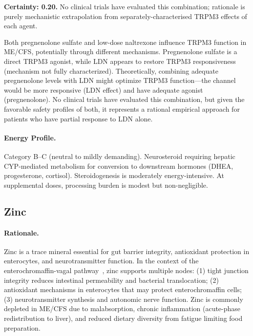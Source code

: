 \begin{speculation}
\label{spec:pregnenolone-ldn-synergy}
\textbf{Certainty: 0.20.} No clinical trials have evaluated this combination; rationale is purely mechanistic extrapolation from separately-characterised TRPM3 effects of each agent.

Both pregnenolone sulfate and low-dose naltrexone influence TRPM3 function in ME/CFS, potentially through different mechanisms. Pregnenolone sulfate is a direct TRPM3 agonist, while LDN appears to restore TRPM3 responsiveness (mechanism not fully characterized). Theoretically, combining adequate pregnenolone levels with LDN might optimize TRPM3 function---the channel would be more responsive (LDN effect) and have adequate agonist (pregnenolone). No clinical trials have evaluated this combination, but given the favorable safety profiles of both, it represents a rational empirical approach for patients who have partial response to LDN alone.
\end{speculation}

\paragraph{Energy Profile.}
Category B--C (neutral to mildly demanding). Neurosteroid requiring hepatic CYP-mediated metabolism for conversion to downstream hormones (DHEA, progesterone, cortisol). Steroidogenesis is moderately energy-intensive. At supplemental doses, processing burden is modest but non-negligible.

\subsection{Zinc}
\label{subsec:zinc}

\paragraph{Rationale.} Zinc is a trace mineral essential for gut barrier integrity, antioxidant protection in enterocytes, and neurotransmitter function. In the context of the enterochromaffin-vagal pathway~\cite{WirthScheibenbogen2025Neurotransmitter}, zinc supports multiple nodes: (1) tight junction integrity reduces intestinal permeability and bacterial translocation; (2) antioxidant mechanisms in enterocytes that may protect enterochromaffin cells; (3) neurotransmitter synthesis and autonomic nerve function. Zinc is commonly depleted in ME/CFS due to malabsorption, chronic inflammation (acute-phase redistribution to liver), and reduced dietary diversity from fatigue limiting food preparation.

